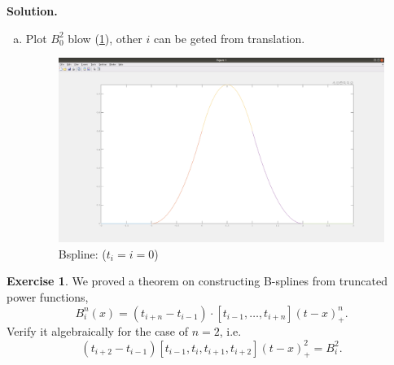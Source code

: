 \documentclass[a4paper]{book}
\newenvironment{solution}%
{\noindent\textbf{Solution.}}%
{\qedhere}
\numberwithin{equation}{chapter}
\theoremstyle{definition}
\newtheorem{exc}[exm]{Exercise}
\begin{document}
\begin{solution}
\begin{enumerate}[(a)]
  \item Plot $B_0^2$ blow (\ref{fig:2}), other $i$ can be geted from translation.
    \begin{figure}
      \centering
      \includegraphics[scale=0.25]{Bspline.png}
      \caption{Bspline: ($t_i = i = 0$)}\label{fig:2}
    \end{figure}
  \end{enumerate}
\end{solution}

\begin{exc}
  We proved a theorem on constructing B-splines from truncated power functions,
  \[B_i^n(x) = (t_{i+n} - t_{i-1}) \cdot [t_{i-1}, \ldots ,t_{i+n}](t - x)_+^n.\]
  Verify it algebraically for the case of $n = 2$, i.e.
  \[(t_{i+2} - t_{i-1})[t_{i-1},t_i,t_{i+1},t_{i+2}](t - x)_+^2 = B_i^2.\]
\end{exc}
\end{document}
